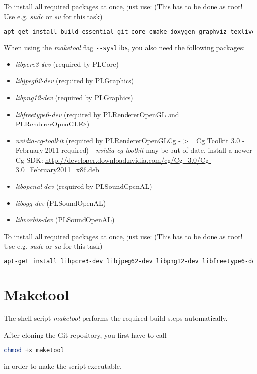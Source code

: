 To install all required packages at once, just use: (This has to be done as root! Use e.g. \emph{sudo} or \emph{su} for this task)
\begin{lstlisting}[language=bash]
apt-get install build-essential git-core cmake doxygen graphviz texlive texlive-science texlive-latex-extra libncurses5-dev libzip-dev libxcursor-dev libxext-dev libdbus-1-dev libxxf86vm-dev libglu1-mesa-dev libxrandr-dev
\end{lstlisting}

When using the \emph{maketool} flag \verb+--syslibs+, you also need the following packages:
\begin{itemize}
\item{\emph{libpcre3-dev} (required by PLCore)}
\item{\emph{libjpeg62-dev} (required by PLGraphics)}
\item{\emph{libpng12-dev} (required by PLGraphics)}
\item{\emph{libfreetype6-dev} (required by PLRendererOpenGL and PLRendererOpenGLES)}
\item{\emph{nvidia-cg-toolkit} (required by PLRendererOpenGLCg - >= Cg Toolkit 3.0 - February 2011 required) - \emph{nvidia-cg-toolkit} may be out-of-date, install a newer Cg SDK: \url{http://developer.download.nvidia.com/cg/Cg_3.0/Cg-3.0_February2011_x86.deb}}
\item{\emph{libopenal-dev} (required by PLSoundOpenAL)}
\item{\emph{libogg-dev} (PLSoundOpenAL)}
\item{\emph{libvorbis-dev} (PLSoundOpenAL)}
\end{itemize}

To install all required packages at once, just use: (This has to be done as root! Use e.g. \emph{sudo} or \emph{su} for this task)
\begin{lstlisting}[language=bash]
apt-get install libpcre3-dev libjpeg62-dev libpng12-dev libfreetype6-dev libopenal-dev libogg-dev libvorbis-dev
\end{lstlisting}




\section{Maketool}
The shell script \emph{maketool} performs the required build steps automatically.

After cloning the Git repository, you first have to call
\begin{lstlisting}[language=bash]
chmod +x maketool
\end{lstlisting}
in order to make the script executable.

